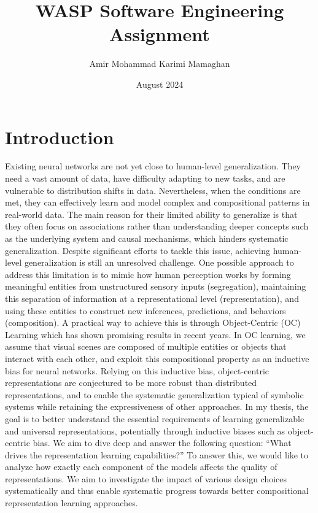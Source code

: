 \documentclass[11pt]{article}
\title{WASP Software Engineering Assignment}
\author{Amir Mohammad Karimi Mamaghan}
\date{August 2024}
\begin{document}
\maketitle

\section{Introduction}
Existing neural networks are not yet close to human-level generalization. They need a vast amount of data, have difficulty adapting to new tasks, and are vulnerable to distribution shifts in data. Nevertheless, when the conditions are met, they can effectively learn and model complex and compositional patterns in real-world data. The main reason for their limited ability to generalize is that they often focus on associations rather than understanding deeper concepts such as the underlying system and causal mechanisms, which hinders systematic generalization. Despite significant efforts to tackle this issue, achieving human-level generalization is still an unresolved challenge.
One possible approach to address this limitation is to mimic how human perception works by forming meaningful entities from unstructured sensory inputs (segregation), maintaining this separation of information at a representational level (representation), and using these entities to construct new inferences, predictions, and behaviors (composition). A practical way to achieve this is through Object-Centric (OC) Learning \citep{locatello2020object, greff2020binding} which has shown promising results in recent years. In OC learning, we assume that visual scenes are composed of multiple entities or objects that interact with each other, and exploit this compositional property as an inductive bias for neural networks. Relying on this inductive bias, object-centric representations are conjectured to be more robust than distributed representations, and to enable the systematic generalization typical of symbolic systems while retaining the expressiveness of other approaches.
In my thesis, the goal is to better understand the essential requirements of learning generalizable and universal representations, potentially through inductive biases such as object-centric bias. We aim to dive deep and answer the following question: “What drives the representation learning capabilities?” To answer this, we would like to analyze how exactly each component of the models affects the quality of representations. We aim to investigate the impact of various design choices systematically and thus enable systematic progress towards better compositional representation learning approaches.
\end{document}
